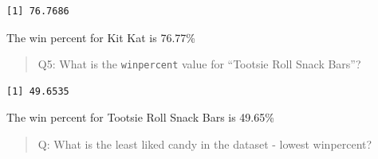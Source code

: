 \documentclass[
  letterpaper,
  DIV=11,
  numbers=noendperiod]{scrartcl}
\newenvironment{Shaded}{\begin{snugshade}}{\end{snugshade}}
\newcommand{\FunctionTok}[1]{\textcolor[rgb]{0.28,0.35,0.67}{#1}}
\newcommand{\NormalTok}[1]{\textcolor[rgb]{0.00,0.23,0.31}{#1}}
\newcommand{\OtherTok}[1]{\textcolor[rgb]{0.00,0.23,0.31}{#1}}
\newcommand{\SpecialCharTok}[1]{\textcolor[rgb]{0.37,0.37,0.37}{#1}}
\newcommand{\StringTok}[1]{\textcolor[rgb]{0.13,0.47,0.30}{#1}}
\begin{document}
\begin{Shaded}
\end{Shaded}

\begin{verbatim}
[1] 76.7686
\end{verbatim}

The win percent for Kit Kat is 76.77\%

\begin{quote}
Q5: What is the \texttt{winpercent} value for ``Tootsie Roll Snack
Bars''?
\end{quote}

\begin{Shaded}
\end{Shaded}

\begin{verbatim}
[1] 49.6535
\end{verbatim}

The win percent for Tootsie Roll Snack Bars is 49.65\%

\begin{quote}
Q: What is the least liked candy in the dataset - lowest winpercent?
\end{quote}

\begin{Shaded}
\end{Shaded}
\end{document}
